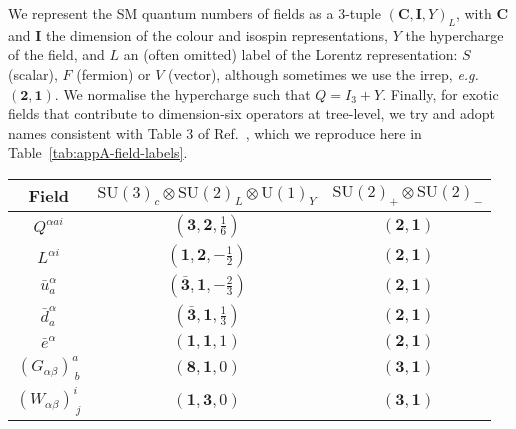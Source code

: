 We represent the SM quantum numbers of fields as a 3-tuple
$(\mathbf{C}, \mathbf{I}, Y)_{L}$, with $\mathbf{C}$ and $\mathbf{I}$ the
dimension of the colour and isospin representations, $Y$ the hypercharge of the
field, and $L$ an (often omitted) label of the Lorentz representation: $S$
(scalar), $F$ (fermion) or $V$ (vector), although sometimes we use the irrep,
\textit{e.g.} $(\mathbf{2}, \mathbf{1})$. We normalise the hypercharge such that
$Q = I_{3} + Y$. Finally, for exotic fields that contribute to dimension-six
operators at tree-level, we try and adopt names consistent with Table 3 of
Ref.~\cite{deBlas:2017xtg}, which we reproduce here in
Table~\ref{tab:appA-field-labels}.

\begin{table}[t]
  \centering
  \bgroup
  \def\arraystretch{1.5}%
  \begin{tabular}{ccc}
    \toprule
    Field                        & $\mathrm{SU}(3)_{c} \otimes \mathrm{SU}(2)_{L} \otimes \mathrm{U}(1)_{Y}$ & $\mathrm{SU}(2)_{+} \otimes \mathrm{SU}(2)_{-}$ \\
    \midrule
    $Q^{\alpha a i}$             & $(\mathbf{3}, \mathbf{2}, \tfrac{1}{6})$                                  & $(\mathbf{2}, \mathbf{1})$                      \\
    $L^{\alpha i}$               & $(\mathbf{1}, \mathbf{2}, -\tfrac{1}{2})$                                 & $(\mathbf{2}, \mathbf{1})$                      \\
    $\bar{u}^{\alpha}_a$                  & $(\bar{\mathbf{3}}, \mathbf{1}, -\tfrac{2}{3})$                           & $(\mathbf{2}, \mathbf{1})$                      \\
    $\bar{d}^{\alpha}_a$                  & $(\bar{\mathbf{3}}, \mathbf{1}, \tfrac{1}{3})$                            & $(\mathbf{2}, \mathbf{1})$                      \\
    $\bar{e}^{\alpha}$                    & $(\mathbf{1}, \mathbf{1}, 1)$                                             & $(\mathbf{2}, \mathbf{1})$                      \\
    $(G_{\alpha \beta})^a_{\ b}$ & $(\mathbf{8}, \mathbf{1}, 0)$                                             & $(\mathbf{3}, \mathbf{1})$                      \\
    $(W_{\alpha \beta})^i_{\ j}$ & $(\mathbf{1}, \mathbf{3}, 0)$                                             & $(\mathbf{3}, \mathbf{1})$                      \\

\end{tabular}
\end{table}
